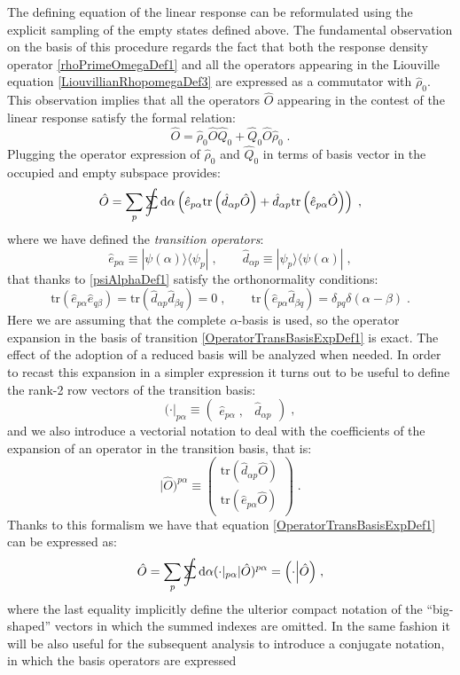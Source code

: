 \documentclass[a4paper]{article}
\newcommand{\dd}{{\rm d}}
\newcommand{\sint}{\mathrlap{\displaystyle\int}
\mathrlap{\textstyle\sum}
\phantom{\mathrlap{\displaystyle
\int}\textstyle\sum}}
\newcommand{\be}{\begin{equation}}
\newcommand{\ee}{\end{equation}}
\newcommand{\qq}{\qquad}
\newcommand{\lb}{\label}
\newcommand{\mat}[1]{\begin{pmatrix} #1\end{pmatrix}}
\newcommand{\op}[1]{\hat {#1}}
\newcommand{\trace}[1]{\mathrm{tr}\left(#1\right)}
\newcommand{\ketbra}[2]{| #1 \rangle \langle #2 |}
\newcommand{\sket}[2]{| #2)^{#1}}
\newcommand{\sbra}[2]{( #2|_{#1}}
\newcommand{\dbraket}[2]{\Bigl(#1 \Bigl| #2 \Bigr)}
\newcommand{\dmnot}{\op{\rho}_0}
\newcommand{\excite}[2]{\op e_{{#1}{#2}}}
\newcommand{\decay}[2]{\op d_{{#1}{#2}}}
\begin{document}
The defining equation of the linear response can be reformulated using the explicit sampling of the empty states defined above. The fundamental observation on the basis
of this procedure regards the fact that both the response density operator \eqref{rhoPrimeOmegaDef1} and all the operators appearing in the Liouville equation 
\eqref{LiouvillianRhopomegaDef3} are expressed as a commutator with $\dmnot$. This observation implies that all the operators $\op O$ appearing in the contest of the linear 
response satisfy the formal relation:
\be
\op O = \dmnot\op O\op Q_0 + \op Q_0\op O\dmnot \;.
\ee
Plugging the operator expression of $\dmnot$ and $\op Q_0$ in terms of basis vector in the occupied and empty subspace provides:
\be\lb{OperatorTransBasisExpDef1}
\op O = \sum_p\sint \dd \alpha\left(
\excite{p}{\alpha}\trace{\decay{\alpha}{p}\op O} + \decay{\alpha}{p}\trace{\excite{p}{\alpha}\op O}
\right) \;,
\ee
where we have defined the \emph{transition operators}:
\be
\excite{p}{\alpha} \equiv \ketbra{\psi(\alpha)}{\psi_p}\;, \qq
\decay{\alpha}{p} \equiv \ketbra{\psi_p}{\psi(\alpha)} \;,
\ee
that thanks to \eqref{psiAlphaDef1} satisfy the orthonormality conditions:
\be\lb{transitionOpOrthonormalityDef1}
\trace{\excite{p}{\alpha}\excite{q}{\beta}} = \trace{\decay{\alpha}{p}\decay{\beta}{q}} = 0 \;, \qq
\trace{\excite{p}{\alpha}\decay{\beta}{q}} = \delta_{pq}\delta(\alpha-\beta) \;.
\ee
Here we are assuming that the complete $\alpha$-basis is used, so the operator expansion in the basis of transition \eqref{OperatorTransBasisExpDef1} is exact. The effect of
the adoption of a reduced basis will be analyzed when needed. 
In order to recast this expansion in a simpler expression it turns out to be useful to define the rank-2 row vectors of the transition basis: 
\be
\sbra{p\alpha}{\cdot} \equiv 
\mat{ \excite{p}{\alpha} \;, & \decay{\alpha}{p} }\;,
\ee
and we also introduce a vectorial notation to deal with the coefficients of the expansion of an operator in the transition basis, that is: 
\be\lb{OperatorTransitionCoeffDef1}
\sket{p\alpha}{\op O}  \equiv \mat{ \trace{\decay{\alpha}{p}\op O } \\ 
\trace{\excite{p}{\alpha}\op O}} \; .
\ee
Thanks to this formalism we have that equation \eqref{OperatorTransBasisExpDef1} can be expressed as:
\be\lb{OperatorTransBasisExpDef2}
\op O = \sum_p\sint \dd \alpha \sbra{p\alpha}{\cdot}\sket{p\alpha}{\op O} = 
\dbraket{\cdot}{\op O} \;,
\ee
where the last equality implicitly define the ulterior compact notation of the ``big-shaped'' vectors in which the summed indexes are omitted.  
In the same fashion it will be also useful for the subsequent analysis to introduce a conjugate notation, in which the basis operators are expressed
\end{document}
